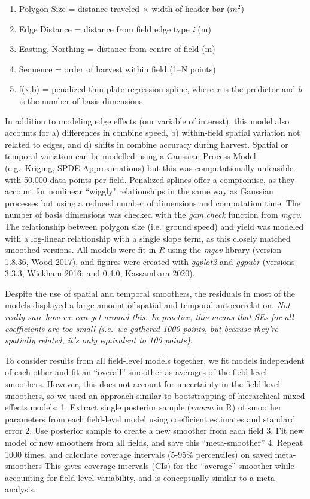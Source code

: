 \documentclass[]{elsarticle} %
\providecommand{\tightlist}{%
  \setlength{\itemsep}{0pt}\setlength{\parskip}{0pt}}
\begin{document}
\begin{enumerate}
\def\labelenumi{\arabic{enumi}.}
\tightlist
\item
  Polygon Size = distance traveled \(\times\) width of header bar (\(m^2\))
\item
  Edge Distance = distance from field edge type \emph{i} (m)
\item
  Easting, Northing = distance from centre of field (m)
\item
  Sequence = order of harvest within field (1--N points)
\item
  f(x,b) = penalized thin-plate regression spline, where \emph{x} is the predictor and \emph{b} is the number of basis dimensions
\end{enumerate}

In addition to modeling edge effects (our variable of interest), this model also accounts for a) differences in combine speed, b) within-field spatial variation not related to edges, and d) shifts in combine accuracy during harvest.
Spatial or temporal variation can be modelled using a Gaussian Process Model (e.g.~Kriging, SPDE Approximations) but this was computationally unfeasible with 50,000 data points per field.
Penalized splines offer a compromise, as they account for nonlinear ``wiggly" relationships in the same way as Gaussian processes but using a reduced number of dimensions and computation time.
The number of basis dimensions was checked with the \emph{gam.check} function from \emph{mgcv}.
The relationship between polygon size (i.e.~ground speed) and yield was modeled with a log-linear relationship with a single slope term, as this closely matched smoothed versions.
All models were fit in \emph{R} using the \emph{mgcv} library (version 1.8.36, Wood 2017), and figures were created with \emph{ggplot2} and \emph{ggpubr} (versions 3.3.3, Wickham 2016; and 0.4.0, Kassambara 2020).

Despite the use of spatial and temporal smoothers, the residuals in most of the models displayed a large amount of spatial and temporal autocorrelation.
\emph{Not really sure how we can get around this. In practice, this means that SEs for all coefficients are too small (i.e.~we gathered 1000 points, but because they're spatially related, it's only equivalent to 100 points).}

To consider results from all field-level models together, we fit models independent of each other and fit an ``overall'' smoother as averages of the field-level smoothers.
However, this does not account for uncertainty in the field-level smoothers, so we used an approach similar to bootstrapping of hierarchical mixed effects models:
1. Extract single posterior sample (\emph{rnorm} in R) of smoother parameters from each field-level model using coefficient estimates and standard error
2. Use posterior sample to create a new smoother from each field
3. Fit new model of new smoothers from all fields, and save this ``meta-smoother''
4. Repeat 1000 times, and calculate coverage intervals (5-95\% percentiles) on saved meta-smoothers
This gives coverage intervals (CIs) for the ``average'' smoother while accounting for field-level variability, and is conceptually similar to a meta-analysis.
\end{document}
